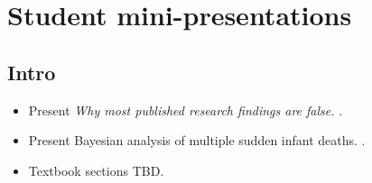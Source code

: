 \documentclass{article} %
\begin{document}
%
%
%
%
%
%
%
%


{}



\appendix

\section{Student mini-presentations}

\subsection{Intro} 
\begin{itemize}
\item Present \textit{Why most published research findings are false. } \cite{ioannidis2005most}.
\item Present Bayesian analysis of multiple sudden infant deaths.  \cite{hill2004multiple}.
\item Textbook sections TBD. 
\end{itemize}
\end{document}
